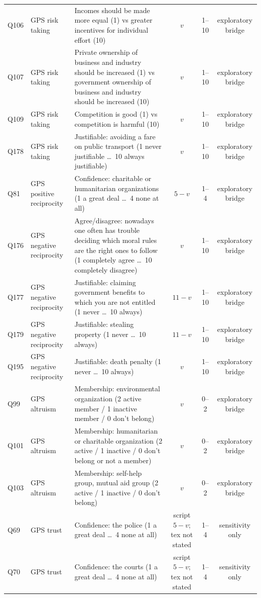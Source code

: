 \begin{table}[p]
\begin{tabularx}{\textwidth}{llXccc}
Q106 & GPS risk taking & Incomes should be made more equal (1) vs greater incentives for individual effort (10) & $v$ & 1--10 & exploratory bridge \\
Q107 & GPS risk taking & Private ownership of business and industry should be increased (1) vs government ownership of business and industry should be increased (10) & $v$ & 1--10 & exploratory bridge \\
Q109 & GPS risk taking & Competition is good (1) vs competition is harmful (10) & $v$ & 1--10 & exploratory bridge \\
Q178 & GPS risk taking & Justifiable: avoiding a fare on public transport (1 never justifiable \dots\ 10 always justifiable) & $v$ & 1--10 & exploratory bridge \\
Q81 & GPS positive reciprocity & Confidence: charitable or humanitarian organizations (1 a great deal \dots\ 4 none at all) & $5-v$ & 1--4 & exploratory bridge \\
Q176 & GPS negative reciprocity & Agree/disagree: nowadays one often has trouble deciding which moral rules are the right ones to follow (1 completely agree \dots\ 10 completely disagree) & $v$ & 1--10 & exploratory bridge \\
Q177 & GPS negative reciprocity & Justifiable: claiming government benefits to which you are not entitled (1 never \dots\ 10 always) & $11-v$ & 1--10 & exploratory bridge \\
Q179 & GPS negative reciprocity & Justifiable: stealing property (1 never \dots\ 10 always) & $11-v$ & 1--10 & exploratory bridge \\
Q195 & GPS negative reciprocity & Justifiable: death penalty (1 never \dots\ 10 always) & $v$ & 1--10 & exploratory bridge \\
Q99 & GPS altruism & Membership: environmental organization (2 active member / 1 inactive member / 0 don't belong) & $v$ & 0--2 & exploratory bridge \\
Q101 & GPS altruism & Membership: humanitarian or charitable organization (2 active / 1 inactive / 0 don't belong or not a member) & $v$ & 0--2 & exploratory bridge \\
Q103 & GPS altruism & Membership: self-help group, mutual aid group (2 active / 1 inactive / 0 don't belong) & $v$ & 0--2 & exploratory bridge \\
Q69 & GPS trust & Confidence: the police (1 a great deal \dots\ 4 none at all) & script $5-v$; tex not stated & 1--4 & sensitivity only \\
Q70 & GPS trust & Confidence: the courts (1 a great deal \dots\ 4 none at all) & script $5-v$; tex not stated & 1--4 & sensitivity only \\

\end{tabularx}
\end{table}
